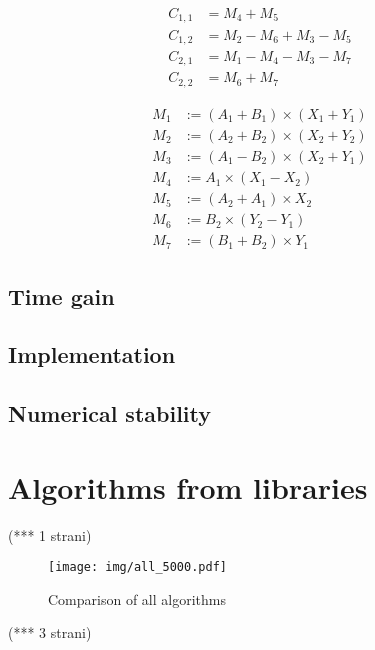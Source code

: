 \documentclass[a4paper,11pt]{article}
\begin{document}
\begin{align*}
C_{1,1} &= M_{4} + M_{5}\\
C_{1,2} &= M_{2} - M_{6} + M_{3} - M_{5} \\
C_{2,1} &= M_{1} - M_{4} - M_{3} - M_{7} \\
C_{2,2} &= M_{6} + M_{7}
\end{align*}

\begin{align*}
M_{1} &:= (A_{1} + B_{1}) \times (X_{1} + Y_{1}) \\
M_{2} &:= (A_{2} + B_{2}) \times (X_{2} + Y_{2}) \\
M_{3} &:= (A_{1} - B_{2}) \times (X_{2} + Y_{1}) \\
M_{4} &:= A_{1} \times (X_{1} - X_{2}) \\
M_{5} &:= (A_{2} + A_{1}) \times X_{2} \\
M_{6} &:= B_{2} \times (Y_{2} - Y_{1}) \\
M_{7} &:= (B_{1} + B_{2}) \times Y_{1}
\end{align*}



\subsection{Time gain}

\subsection{Implementation}

\subsection{Numerical stability}

\section{Algorithms from libraries}
(*** 1 strani)



\begin{figure}[h]
\centering
\texttt{[image: img/all\_5000.pdf]}
\caption{Comparison of all algorithms}
\label{fig:classic}
\end{figure}
(*** 3 strani)
\end{document}
